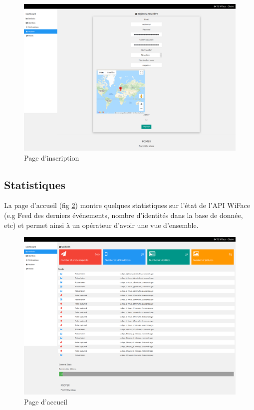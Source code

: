 \clearpage
\newpage
\thispagestyle{empty}
\begin{landscape}
    \centering
\thispagestyle{empty}
\begin{figure}[h]
	\includegraphics[width=\linewidth]{images/dashboard/register.png}
	\caption{Page d'inscription}
	\label{fig:dashboard_register}
\end{figure}
\end{landscape}

\subsection{Statistiques}

La page d'accueil (fig \ref{fig:dashboard_stats}) montre quelques statistiques sur l'état de l'API WiFace (e.g Feed des derniers événements, nombre d'identités dans la base de donnée, etc)
et permet ainsi à un opérateur d'avoir une vue d'ensemble.
\clearpage
\newpage
\thispagestyle{empty}
\begin{landscape}
    \centering
\thispagestyle{empty}
\begin{figure}[h]
	\includegraphics[width=\linewidth]{images/dashboard/statistics.png}
	\caption{Page d'accueil}
	\label{fig:dashboard_stats}
\end{figure}
\end{landscape}

